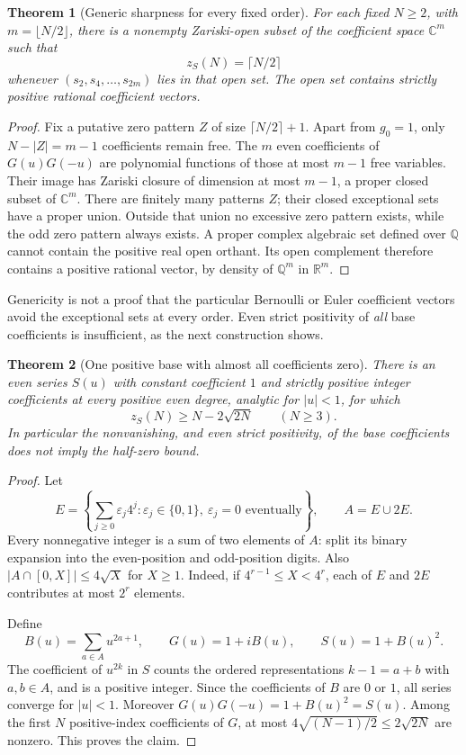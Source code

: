 \documentclass[11pt,a4paper]{article}
\newtheorem{theorem}{Theorem}[section]
\theoremstyle{definition}\newtheorem{definition}[theorem]{Definition}
\theoremstyle{remark}\newtheorem{remark}[theorem]{Remark}
\newcommand{\Q}{\mathbb Q}\newcommand{\Qb}{\overline{\mathbb Q}}
\newcommand{\C}{\mathbb C}\newcommand{\R}{\mathbb R}\newcommand{\Z}{\mathbb Z}
\begin{document}
\begin{theorem}[Generic sharpness for every fixed order]\label{thm:generic}
For each fixed $N\ge2$, with $m=\lfloor N/2\rfloor$, there is a nonempty Zariski-open subset of the coefficient space $\C^m$ such that
\[
z_S(N)=\lceil N/2\rceil
\]
whenever $(s_2,s_4,\ldots,s_{2m})$ lies in that open set. The open set contains strictly positive rational coefficient vectors.
\end{theorem}
\begin{proof}
Fix a putative zero pattern $Z$ of size $\lceil N/2\rceil+1$. Apart from $g_0=1$, only
$N-|Z|=m-1$ coefficients remain free. The $m$ even coefficients of $G(u)G(-u)$ are polynomial functions of those at most $m-1$ free variables. Their image has Zariski closure of dimension at most $m-1$, a proper closed subset of $\C^m$. There are finitely many patterns $Z$; their closed exceptional sets have a proper union. Outside that union no excessive zero pattern exists, while the odd zero pattern always exists. A proper complex algebraic set defined over $\Q$ cannot contain the positive real open orthant. Its open complement therefore contains a positive rational vector, by density of $\Q^m$ in $\R^m$.
\end{proof}

Genericity is not a proof that the particular Bernoulli or Euler coefficient vectors avoid the exceptional sets at every order. Even strict positivity of \emph{all} base coefficients is insufficient, as the next construction shows.

\begin{theorem}[One positive base with almost all coefficients zero]\label{thm:positivecounter}
There is an even series $S(u)$ with constant coefficient $1$ and \emph{strictly positive integer} coefficients at every positive even degree, analytic for $|u|<1$, for which
\[
z_S(N)\ge N-2\sqrt{2N}\qquad(N\ge3).
\]
In particular the nonvanishing, and even strict positivity, of the base coefficients does not imply the half-zero bound.
\end{theorem}
\begin{proof}
Let
\[
E=\left\{\sum_{j\ge0}\varepsilon_j4^j:
\varepsilon_j\in\{0,1\},\ \varepsilon_j=0\text{ eventually}\right\},
\qquad A=E\cup2E.
\]
Every nonnegative integer is a sum of two elements of $A$: split its binary expansion into the even-position and odd-position digits. Also
$|A\cap[0,X]|\le4\sqrt X$ for $X\ge1$. Indeed, if $4^{r-1}\le X<4^r$, each of $E$ and $2E$ contributes at most $2^r$ elements.

Define
\[
B(u)=\sum_{a\in A}u^{2a+1},\qquad
G(u)=1+iB(u),\qquad S(u)=1+B(u)^2.
\]
The coefficient of $u^{2k}$ in $S$ counts the ordered representations $k-1=a+b$ with $a,b\in A$, and is a positive integer. Since the coefficients of $B$ are $0$ or $1$, all series converge for $|u|<1$. Moreover
$G(u)G(-u)=1+B(u)^2=S(u)$. Among the first $N$ positive-index coefficients of $G$, at most
$4\sqrt{(N-1)/2}\le2\sqrt{2N}$ are nonzero. This proves the claim.
\end{proof}
\end{document}
